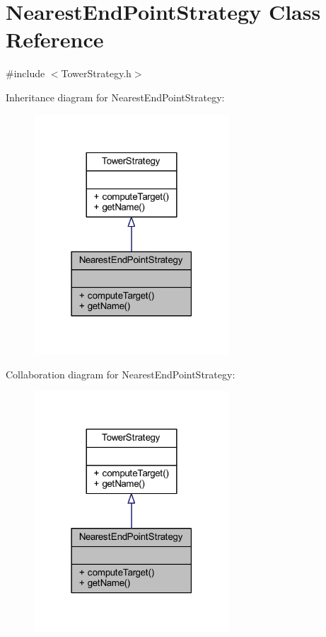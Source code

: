 \hypertarget{class_nearest_end_point_strategy}{\section{Nearest\+End\+Point\+Strategy Class Reference}
\label{class_nearest_end_point_strategy}
}


{\ttfamily \#include $<$Tower\+Strategy.\+h$>$}



Inheritance diagram for Nearest\+End\+Point\+Strategy\+:\nopagebreak
\begin{figure}[H]
\begin{center}
\leavevmode
\includegraphics[width=207pt]{class_nearest_end_point_strategy__inherit__graph}
\end{center}
\end{figure}


Collaboration diagram for Nearest\+End\+Point\+Strategy\+:\nopagebreak
\begin{figure}[H]
\begin{center}
\leavevmode
\includegraphics[width=207pt]{class_nearest_end_point_strategy__coll__graph}
\end{center}
\end{figure}

